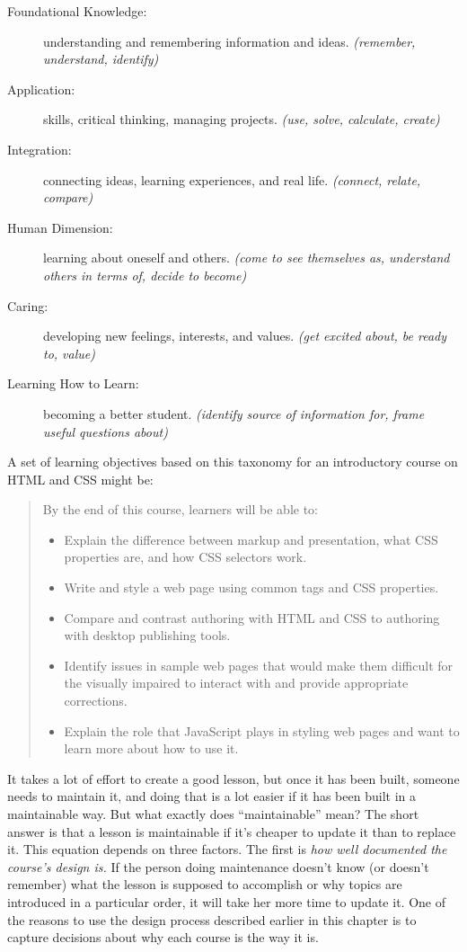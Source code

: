 \begin{description}
\item[Foundational Knowledge:]
understanding and remembering information and ideas. \emph{(remember,
understand, identify)}
\item[Application:]
skills, critical thinking, managing projects. \emph{(use, solve,
calculate, create)}
\item[Integration:]
connecting ideas, learning experiences, and real life. \emph{(connect,
relate, compare)}
\item[Human Dimension:]
learning about oneself and others. \emph{(come to see themselves as,
understand others in terms of, decide to become)}
\item[Caring:]
developing new feelings, interests, and values. \emph{(get excited about,
be ready to, value)}
\item[Learning How to Learn:]
becoming a better student. \emph{(identify source of information for,
frame useful questions about)}
\end{description}

A set of learning objectives based on this taxonomy for an
introductory course on HTML and CSS might be:

\begin{quote}
By the end of this course, learners will be able to:

\begin{itemize}
\item
  Explain the difference between markup and presentation, what CSS
  properties are, and how CSS selectors work.
\item
  Write and style a web page using common tags and CSS properties.
\item
  Compare and contrast authoring with HTML and CSS to authoring with
  desktop publishing tools.
\item
  Identify issues in sample web pages that would make them difficult
  for the visually impaired to interact with and provide appropriate
  corrections.
\item
  Explain the role that JavaScript plays in styling web pages and
  want to learn more about how to use it.
\end{itemize}
\end{quote}


It takes a lot of effort to create a good lesson, but once it has been
built, someone needs to maintain it, and doing that is a lot easier if
it has been built in a maintainable way. But what exactly does
``maintainable'' mean? The short answer is that a lesson is maintainable
if it's cheaper to update it than to replace it. This equation depends
on three factors. The first is \emph{how well documented the course's
design is.} If the person doing maintenance doesn't know (or doesn't
remember) what the lesson is supposed to accomplish or why topics are
introduced in a particular order, it will take her more time to update
it. One of the reasons to use the design process described earlier in
this chapter is to capture decisions about why each course is the way
it is.

